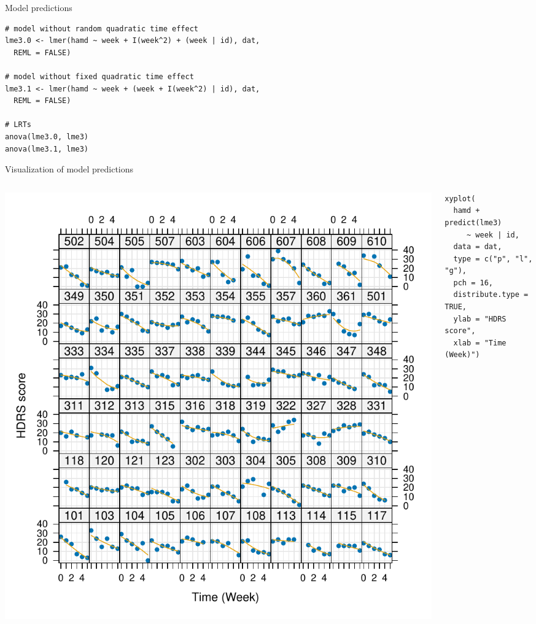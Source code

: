 \documentclass[aspectratio=169]{beamer}
\begin{document}
\begin{frame}[fragile]{Model predictions}
  \begin{lstlisting}
# model without random quadratic time effect 
lme3.0 <- lmer(hamd ~ week + I(week^2) + (week | id), dat,
  REML = FALSE)

# model without fixed quadratic time effect 
lme3.1 <- lmer(hamd ~ week + (week + I(week^2) | id), dat,
  REML = FALSE)

# LRTs
anova(lme3.0, lme3)
anova(lme3.1, lme3)
  \end{lstlisting}
\end{frame}

\begin{frame}[fragile]{Visualization of model predictions}
  \begin{columns}
    \begin{column}{8cm}
      \includegraphics[scale=.5]{../figures/hdrs-pred}
    \end{column}
    \begin{column}{6cm}
      \begin{lstlisting}
xyplot(
  hamd + predict(lme3)
     ~ week | id,
  data = dat,
  type = c("p", "l", "g"),
  pch = 16,
  distribute.type = TRUE,
  ylab = "HDRS score",
  xlab = "Time (Week)")
      \end{lstlisting}
    \end{column}
  \end{columns}
\end{frame}
\end{document}
